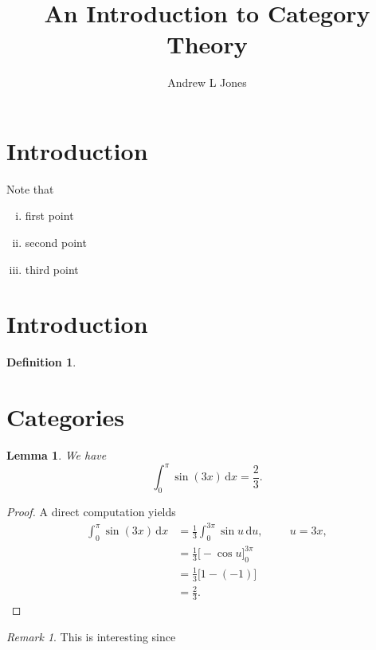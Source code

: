 \documentclass{article}
\title{An Introduction to Category Theory}
\author{Andrew L Jones}\date{}
\theoremstyle{plain}
\newtheorem{lemma}{Lemma}
\theoremstyle{definition}
\newtheorem{definition}{Definition}
\theoremstyle{remark}
\newtheorem{remark}{Remark}
\renewcommand{\d}{\mathrm{d}}
\begin{document}
\maketitle



\section*{Introduction}

Note that
\begin{enumerate}[i.,noitemsep]
	\item first point
	\item second point
	\item third point
\end{enumerate}




\section{Introduction}

\begin{definition}
	
\end{definition}




\section{Categories}

\begin{lemma}
	We have
	\[
		\int_0^\pi \sin(3x)\,\d x = \frac{2}{3}.
	\]
\end{lemma}

\begin{proof}
	A direct computation yields
	\begin{align*}
		\int_0^\pi \sin(3x)\,\d x
			&=	\frac{1}{3}\int_0^{3\pi} \sin u \,\d u,		\hspace{1cm} u=3x,		\\
			&=	\frac{1}{3} \big[-\cos u\big]_0^{3\pi}						\\
			&=	\frac{1}{3} \big[1-(-1)\big]						\\
			&=	\frac{2}{3}.
	\end{align*}
\end{proof}

\begin{remark}
	This is interesting since\textellipsis
\end{remark}
\end{document}
